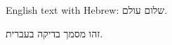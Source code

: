 \documentclass{article}
\begin{document}
English text with Hebrew: \texthebrew{שלום עולם}.
\begin{hebrew}
זהו מסמך בדיקה בעברית.
\end{hebrew}
\end{document}
